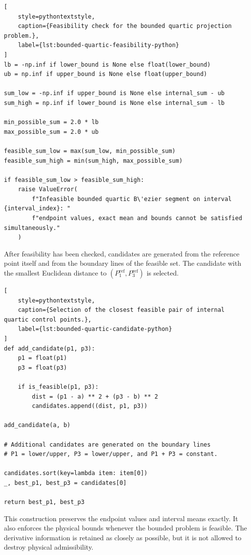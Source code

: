 \documentclass[12pt,a4paper]{article}
\begin{document}
\begin{lstlisting}[
    style=pythontextstyle,
    caption={Feasibility check for the bounded quartic projection problem.},
    label={lst:bounded-quartic-feasibility-python}
]
lb = -np.inf if lower_bound is None else float(lower_bound)
ub = np.inf if upper_bound is None else float(upper_bound)

sum_low = -np.inf if upper_bound is None else internal_sum - ub
sum_high = np.inf if lower_bound is None else internal_sum - lb

min_possible_sum = 2.0 * lb
max_possible_sum = 2.0 * ub

feasible_sum_low = max(sum_low, min_possible_sum)
feasible_sum_high = min(sum_high, max_possible_sum)

if feasible_sum_low > feasible_sum_high:
    raise ValueError(
        f"Infeasible bounded quartic B\'ezier segment on interval {interval_index}: "
        f"endpoint values, exact mean and bounds cannot be satisfied simultaneously."
    )
\end{lstlisting}

After feasibility has been checked, candidates are generated from the
reference point itself and from the boundary lines of the feasible set. The
candidate with the smallest Euclidean distance to
\((P_1^{\mathrm{ref}},P_3^{\mathrm{ref}})\) is selected.

\begin{lstlisting}[
    style=pythontextstyle,
    caption={Selection of the closest feasible pair of internal quartic control points.},
    label={lst:bounded-quartic-candidate-python}
]
def add_candidate(p1, p3):
    p1 = float(p1)
    p3 = float(p3)

    if is_feasible(p1, p3):
        dist = (p1 - a) ** 2 + (p3 - b) ** 2
        candidates.append((dist, p1, p3))

add_candidate(a, b)

# Additional candidates are generated on the boundary lines
# P1 = lower/upper, P3 = lower/upper, and P1 + P3 = constant.

candidates.sort(key=lambda item: item[0])
_, best_p1, best_p3 = candidates[0]

return best_p1, best_p3
\end{lstlisting}

This construction preserves the endpoint values and interval means exactly.
It also enforces the physical bounds whenever the bounded problem is feasible.
The derivative information is retained as closely as possible, but it is not
allowed to destroy physical admissibility.
\end{document}

